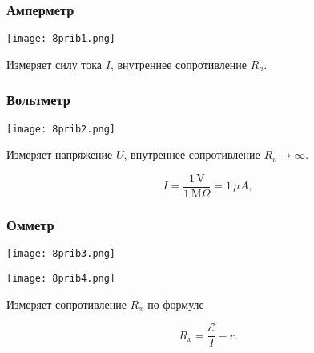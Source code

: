 \documentclass[12pt, a4paper]{article}
\begin{document}
\subsubsection*{Амперметр}

\texttt{[image: 8prib1.png]}

Измеряет силу тока $I$, внутреннее сопротивление $R_a$.

\subsubsection*{Вольтметр}

\texttt{[image: 8prib2.png]}

Измеряет напряжение $U$, внутреннее сопротивление $R_v \to \infty$.

\[
I = \frac{1\,\mathrm{V}}{1\,\mathrm{M}\Omega} = 1\,\mu A,
\]

\subsubsection*{Омметр}

\texttt{[image: 8prib3.png]}

\texttt{[image: 8prib4.png]}

Измеряет сопротивление $R_x$ по формуле

\[
R_x = \frac{\mathscr{E}}{I} - r.
\]
\end{document}
